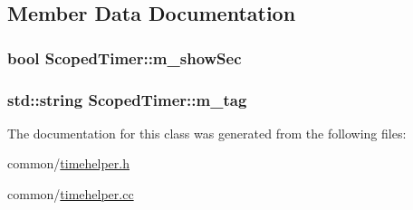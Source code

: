 \subsection{Member Data Documentation}
\hypertarget{classScopedTimer_a644085f13d45fff670f04fd7b4eea467}{
\subsubsection[{m\-\_\-show\-Sec}]{\setlength{\rightskip}{0pt plus 5cm}bool Scoped\-Timer\-::m\-\_\-show\-Sec\hspace{0.3cm}{\ttfamily [private]}}}\label{classScopedTimer_a644085f13d45fff670f04fd7b4eea467}
\hypertarget{classScopedTimer_a2ce039c0c54f703ff547cfbb60f02409}{
\subsubsection[{m\-\_\-tag}]{\setlength{\rightskip}{0pt plus 5cm}std\-::string Scoped\-Timer\-::m\-\_\-tag\hspace{0.3cm}{\ttfamily [private]}}}\label{classScopedTimer_a2ce039c0c54f703ff547cfbb60f02409}


The documentation for this class was generated from the following files\-:\begin{DoxyCompactItemize}
\item 
common/\hyperlink{timehelper_8h}{timehelper.\-h}\item 
common/\hyperlink{timehelper_8cc}{timehelper.\-cc}\end{DoxyCompactItemize}
